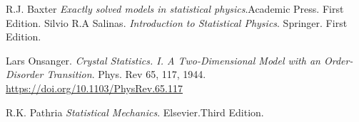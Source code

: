 \documentclass[a4paper]{article}
\begin{document}
\begin{thebibliography}{99}


R.J. Baxter \textit{Exactly solved models in statistical physics}.Academic Press. First Edition.
Silvio R.A Salinas. \textit{Introduction to Statistical Physics}. Springer. First Edition.

 Lars Onsanger. \textit{Crystal Statistics. I. A Two-Dimensional Model with an Order-Disorder Transition}. Phys. Rev 65, 117, 1944. \url{https://doi.org/10.1103/PhysRev.65.117}

R.K. Pathria \textit{Statistical Mechanics}. Elsevier.Third Edition.






\end{thebibliography}
\end{document}
